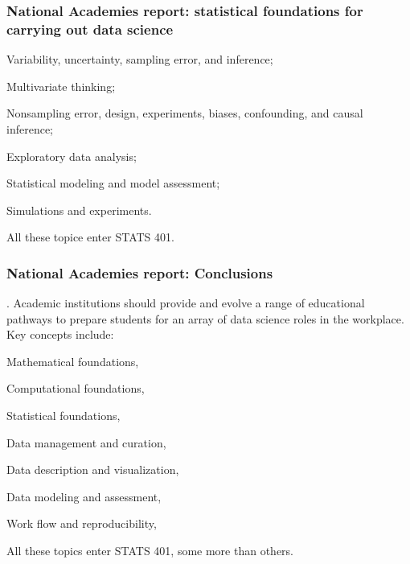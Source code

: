 \documentclass{beamer}
\begin{document}
\begin{frame}

  \frametitle{National Academies report: statistical foundations for carrying out data science}
  \begin{myitemize}
    \item Variability, uncertainty, sampling error, and inference;
   \item Multivariate thinking;
\item Nonsampling error, design, experiments, biases, confounding, and causal inference;
\item Exploratory data analysis;
\item Statistical modeling and model assessment;
\item Simulations and experiments.
  \end{myitemize}

  \vspace{8mm}
  
All these topice enter STATS 401. 
  \end{frame}


\begin{frame}
  \frametitle{National Academies report: Conclusions} %

. Academic institutions should provide and evolve a range of educational pathways to prepare students for an array of data science roles in the workplace. Key concepts include:
  \begin{myitemize}
    \item Mathematical foundations,
    \item Computational foundations,
     \item Statistical foundations,
     \item Data management and curation,
\item Data description and visualization,
\item Data modeling and assessment,
\item Work flow and reproducibility,
  \end{myitemize}

  \vspace{8mm}
  
All these topics enter STATS 401, some more than others.
  \end{frame}
\end{document}
